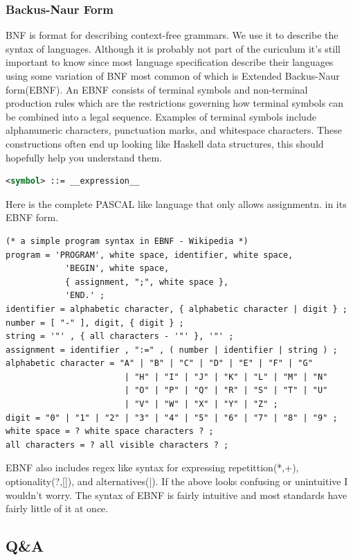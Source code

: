 \documentclass{article}
\begin{document}
        \subsubsection{Backus-Naur Form}
            \gls{BNF} is format for describing context-free grammars. We use it to describe the syntax of languages. Although it is probably not part of the curiculum
            it's still important to know since most language specification describe their languages using some variation of BNF most common of which is Extended Backus-Naur form(EBNF).
            An EBNF consists of terminal symbols and non-terminal production rules which are the restrictions governing how terminal symbols can be combined into a legal sequence. 
            Examples of terminal symbols include alphanumeric characters, punctuation marks, and whitespace characters. These constructions often end up looking like Haskell data structures,
            this should hopefully help you understand them.
            \begin{lstlisting}[language=XML]
<symbol> ::= __expression__
            \end{lstlisting}
            Here is the complete PASCAL like language that only allows assignmentn. in its EBNF form.
            \begin{lstlisting}[language=XML]
(* a simple program syntax in EBNF - Wikipedia *)
program = 'PROGRAM', white space, identifier, white space, 
            'BEGIN', white space, 
            { assignment, ";", white space }, 
            'END.' ;
identifier = alphabetic character, { alphabetic character | digit } ;
number = [ "-" ], digit, { digit } ;
string = '"' , { all characters - '"' }, '"' ;
assignment = identifier , ":=" , ( number | identifier | string ) ;
alphabetic character = "A" | "B" | "C" | "D" | "E" | "F" | "G"
                        | "H" | "I" | "J" | "K" | "L" | "M" | "N"
                        | "O" | "P" | "Q" | "R" | "S" | "T" | "U"
                        | "V" | "W" | "X" | "Y" | "Z" ;
digit = "0" | "1" | "2" | "3" | "4" | "5" | "6" | "7" | "8" | "9" ;
white space = ? white space characters ? ;
all characters = ? all visible characters ? ;
            \end{lstlisting}
            EBNF also includes regex like syntax for expressing repetittion(*,+), optionality(?,[]), and alternatives(|).
            If the above looks confusing or unintuitive I wouldn't worry. The syntax of EBNF is fairly intuitive and most standards have fairly little of it at once.
        \subsection{Q\&A}
\end{document}
